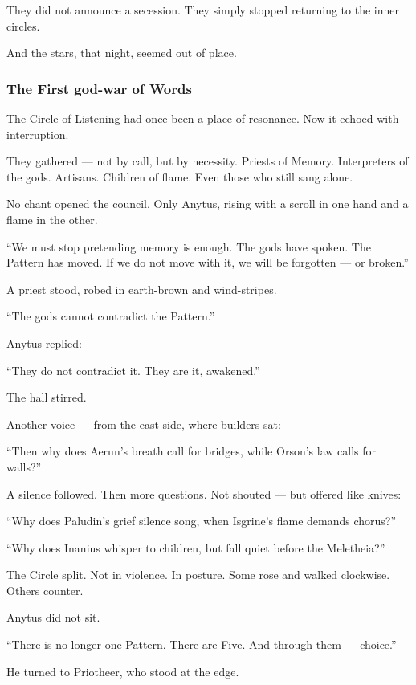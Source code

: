 \documentclass[12pt]{article}
\begin{document}
They did not announce a secession.  
They simply stopped returning to the inner circles.

And the stars, that night, seemed out of place.

\dotfill

\subsubsection*{The First god-war of Words}

The Circle of Listening had once been a place of resonance.  
Now it echoed with interruption.

They gathered — not by call, but by necessity.  
Priests of Memory.  
Interpreters of the gods.  
Artisans. Children of flame.  
Even those who still sang alone.

No chant opened the council.  
Only Anytus, rising with a scroll in one hand and a flame in the other.

 “We must stop pretending memory is enough.  
 The gods have spoken.  
 The Pattern has moved.  
 If we do not move with it, we will be forgotten — or broken.”

A priest stood, robed in earth-brown and wind-stripes.

 “The gods cannot contradict the Pattern.”

Anytus replied:

 “They do not contradict it. They are it, awakened.”

The hall stirred.

Another voice — from the east side, where builders sat:

 “Then why does Aerun’s breath call for bridges,  
 while Orson’s law calls for walls?”

A silence followed.  
Then more questions.  
Not shouted — but offered like knives:

 “Why does Paludin’s grief silence song,  
 when Isgrine’s flame demands chorus?”

 “Why does Inanius whisper to children,  
 but fall quiet before the Meletheia?”

The Circle split.  
Not in violence.  
In posture.  
Some rose and walked clockwise.  
Others counter.

Anytus did not sit.

 “There is no longer one Pattern.  
 There are Five.  
 And through them — choice.”

He turned to Priotheer, who stood at the edge.
\end{document}
